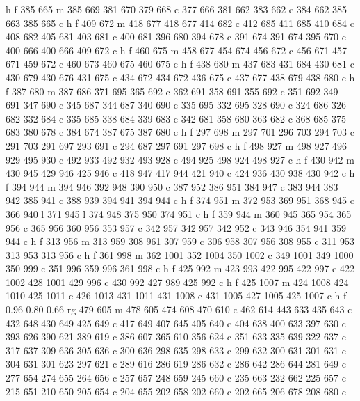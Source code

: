 {{   h f
   385 665 m
   385 669 381 670 379 668 c
   377 666 381 662 383 662 c
   384 662 385 663 385 665 c
   h f
   409 672 m
   418 677 418 677 414 682 c
   412 685 411 685 410 684 c
   408 682 405 681 403 681 c
   400 681 396 680 394 678 c
   391 674 391 674 395 670 c
   400 666 400 666 409 672 c
   h f
   460 675 m
   458 677 454 674 456 672 c
   456 671 457 671 459 672 c
   460 673 460 675 460 675 c
   h f
   438 680 m
   437 683 431 684 430 681 c
   430 679 430 676 431 675 c
   434 672 434 672 436 675 c
   437 677 438 679 438 680 c
   h f
   387 680 m
   387 686 371 695 365 692 c
   362 691 358 691 355 692 c
   351 692 349 691 347 690 c
   345 687 344 687 340 690 c
   335 695 332 695 328 690 c
   324 686 326 682 332 684 c
   335 685 338 684 339 683 c
   342 681 358 680 363 682 c
   368 685 375 683 380 678 c
   384 674 387 675 387 680 c
   h f
   297 698 m
   297 701 296 703 294 703 c
   291 703 291 697 293 691 c
   294 687 297 691 297 698 c
   h f
   498 927 m
   498 927 496 929 495 930 c
   492 933 492 932 493 928 c
   494 925 498 924 498 927 c
   h f
   430 942 m
   430 945 429 946 425 946 c
   418 947 417 944 421 940 c
   424 936 430 938 430 942 c
   h f
   394 944 m
   394 946 392 948 390 950 c
   387 952 386 951 384 947 c
   383 944 383 942 385 941 c
   388 939 394 941 394 944 c
   h f
   374 951 m
   372 953 369 951 368 945 c
   366 940 l
   371 945 l
   374 948 375 950 374 951 c
   h f
   359 944 m
   360 945 365 954 365 956 c
   365 956 360 956 353 957 c
   342 957 342 957 342 952 c
   343 946 354 941 359 944 c
   h f
   313 956 m
   313 959 308 961 307 959 c
   306 958 307 956 308 955 c
   311 953 313 953 313 956 c
   h f
   361 998 m
   362 1001 352 1004 350 1002 c
   349 1001 349 1000 350 999 c
   351 996 359 996 361 998 c
   h f
   425 992 m
   423 993 422 995 422 997 c
   422 1002 428 1001 429 996 c
   430 992 427 989 425 992 c
   h f
   425 1007 m
   424 1008 424 1010 425 1011 c
   426 1013 431 1011 431 1008 c
   431 1005 427 1005 425 1007 c
   h f
   0.96 0.80 0.66 rg
   479 605 m
   478 605 474 608 470 610 c
   462 614 443 633 435 643 c
   432 648 430 649 425 649 c
   417 649 407 645 405 640 c
   404 638 400 633 397 630 c
   393 626 390 621 389 619 c
   386 607 365 610 356 624 c
   351 633 335 639 322 637 c
   317 637 309 636 305 636 c
   300 636 298 635 298 633 c
   299 632 300 631 301 631 c
   304 631 301 623 297 621 c
   289 616 286 619 286 632 c
   286 642 286 644 281 649 c
   277 654 274 655 264 656 c
   257 657 248 659 245 660 c
   235 663 232 662 225 657 c
   215 651 210 650 205 654 c
   204 655 202 658 202 660 c
   202 665 206 678 208 680 c
}}
